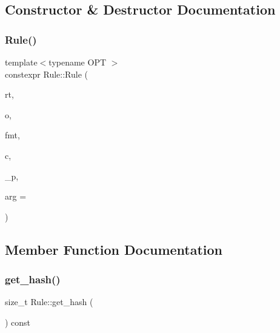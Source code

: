\subsection{Constructor \& Destructor Documentation}
\mbox{\label{class_rule_ad25d1676e2ec236dfea8469f052c0985}} 
\subsubsection{\texorpdfstring{Rule()}{Rule()}}
{\footnotesize\ttfamily template$<$typename O\+PT $>$ \\
constexpr Rule\+::\+Rule (\begin{DoxyParamCaption}\item[{const \hyperlink{_nonterminal_8h_a1c5bfe9b903f69c83bbde5da7035fef3}{nonterminal\+\_\+t}}]{rt,  }\item[{const O\+PT}]{o,  }\item[{const char $\ast$}]{fmt,  }\item[{std\+::initializer\+\_\+list$<$ \hyperlink{_nonterminal_8h_a1c5bfe9b903f69c83bbde5da7035fef3}{nonterminal\+\_\+t} $>$}]{c,  }\item[{double}]{\+\_\+p,  }\item[{const int}]{arg = {} }\end{DoxyParamCaption})\hspace{0.3cm}{\ttfamily [inline]}}



\subsection{Member Function Documentation}
\mbox{\label{class_rule_a62e4d931266a65d4aad9ca3c058d7e25}} 
\subsubsection{\texorpdfstring{get\+\_\+hash()}{get\_hash()}}
{\footnotesize\ttfamily size\+\_\+t Rule\+::get\+\_\+hash (\begin{DoxyParamCaption}{ }\end{DoxyParamCaption}) const\hspace{0.3cm}{\ttfamily [inline]}}

\mbox{\label{class_rule_a9d557e302f94bd85f5505733e8856f97}} 
